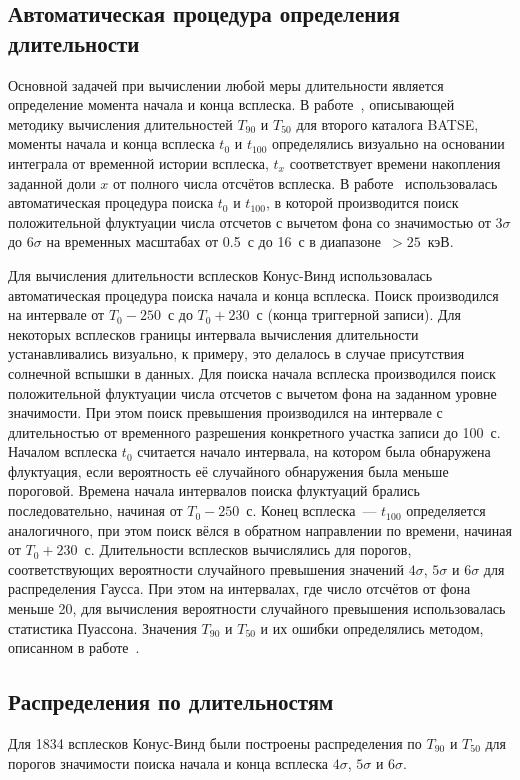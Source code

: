 \subsection{Автоматическая процедура определения длительности}
Основной задачей при вычислении любой меры длительности является определение момента 
начала и конца всплеска. В работе~\citep{Koshut_1996}, описывающей методику вычисления 
длительностей $T_{90}$ и $T_{50}$  для второго каталога BATSE, моменты начала и 
конца всплеска $t_{0}$ и $t_{100}$ определялись визуально на основании интеграла 
от временной истории всплеска, $t_{x}$ соответствует времени накопления заданной 
доли $x$ от полного числа отсчётов всплеска. В работе~\citep{Bonnell_1997} использовалась 
автоматическая процедура поиска $t_{0}$ и $t_{100}$, в которой производится поиск 
положительной флуктуации числа отсчетов с вычетом фона со значимостью от $3\sigma$ 
до $6\sigma$ на временных масштабах от 0.5~с до 16~с в диапазоне~$>25$~кэВ. 

Для вычисления длительности всплесков Конус-Винд использовалась автоматическая 
процедура поиска начала и конца всплеска. Поиск производился на интервале от 
$T_0-250$~с до $T_0+230$~с (конца триггерной записи). Для некоторых всплесков 
границы интервала вычисления длительности устанавливались визуально, к примеру, 
это делалось в случае присутствия солнечной вспышки в данных. Для поиска начала 
всплеска производился поиск положительной флуктуации числа отсчетов с вычетом 
фона на заданном уровне значимости. При этом поиск превышения производился на 
интервале с длительностью от временного разрешения конкретного участка записи до 100~с. 
Началом всплеска $t_0$ считается начало интервала, на котором была обнаружена флуктуация, 
если вероятность её случайного обнаружения была меньше пороговой. Времена начала 
интервалов поиска флуктуаций брались последовательно, начиная от $T_0-250$~с. 
Конец всплеска~--- $t_{100}$ определяется аналогичного, при этом поиск вёлся в 
обратном направлении по времени, начиная от $T_0 + 230$~с. Длительности всплесков 
вычислялись для порогов, соответствующих вероятности случайного превышения 
значений $4\sigma$, $5\sigma$ и $6\sigma$ для распределения Гаусса. При этом на 
интервалах, где число отсчётов от фона меньше 20, для вычисления вероятности 
случайного превышения использовалась статистика Пуассона. Значения $T_{90}$ и $T_{50}$ 
и их ошибки определялись методом, описанном в работе~\citep{Koshut_1996}. 

\subsection{Распределения по длительностям}
Для 1834 всплесков Конус-Винд были построены распределения по $T_{90}$ и $T_{50}$ 
для порогов значимости поиска начала и конца всплеска $4\sigma$, $5\sigma$ и $6\sigma$. 

